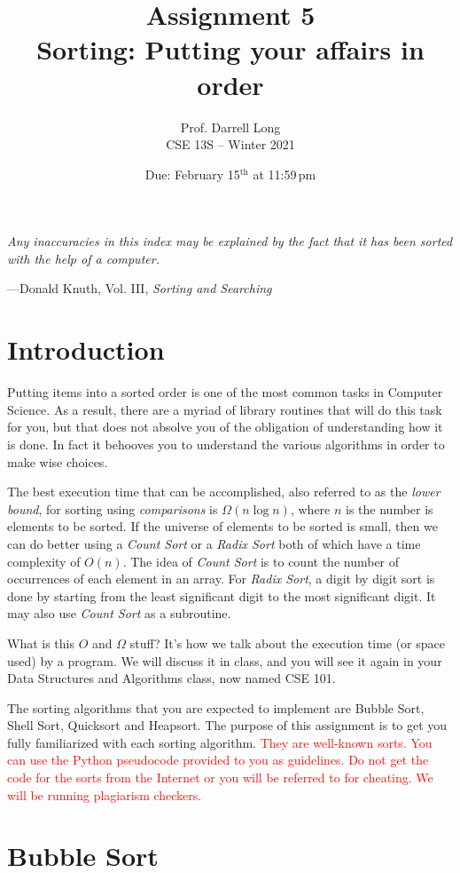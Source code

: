 \documentclass[11pt]{article}
\title{Assignment 5 \\ Sorting: Putting your affairs in order}
\author{Prof. Darrell Long \\ CSE 13S -- Winter 2021}
\date{Due: February 15$^\text{th}$ at 11:59\,pm}
\begin{document}
\maketitle

\textwidth
\epigraph{\emph{Any inaccuracies in this index may be explained by the
fact that it has been sorted with the help of a computer.}}{---Donald
Knuth, Vol.  III, \emph{Sorting and Searching}}


\section{Introduction}

Putting items into a sorted order is one of the most common tasks in
Computer Science. As a result, there are a myriad of library routines
that will do this task for you, but that does not absolve you of the
obligation of understanding how it is done. In fact it behooves you to
understand the various algorithms in order to make wise choices.

The best execution time that can be accomplished, also referred to as
the \emph{lower bound}, for sorting using \emph{comparisons} is
$\Omega(n \log n)$, where $n$ is the number is elements to be sorted. If
the universe of elements to be sorted is small, then we can do better
using a \emph{Count Sort} or a \emph{Radix Sort} both of which have a
time complexity of $O(n)$. The idea of \emph{Count Sort} is to count the
number of occurrences of each element in an array. For \emph{Radix
Sort}, a digit by digit sort is done by starting from the least
significant digit to the most significant digit. It may also use
\emph{Count Sort} as a subroutine.

What is this $O$ and $\Omega$ stuff? It's how we talk about the
execution time (or space used) by a program. We will discuss it in
class, and you will see it again in your Data Structures and Algorithms
class, now named CSE 101.

The sorting algorithms that you are expected to implement are Bubble
Sort, Shell Sort, Quicksort and Heapsort. The purpose of this
assignment is to get you fully familiarized with each sorting algorithm.
\textcolor{red}{They are well-known sorts. You can use the Python
  pseudocode provided to you as guidelines. Do not get the code for the
sorts from the Internet or you will be referred to for cheating. We will
be running plagiarism checkers.}


\section{Bubble Sort}
\end{document}
